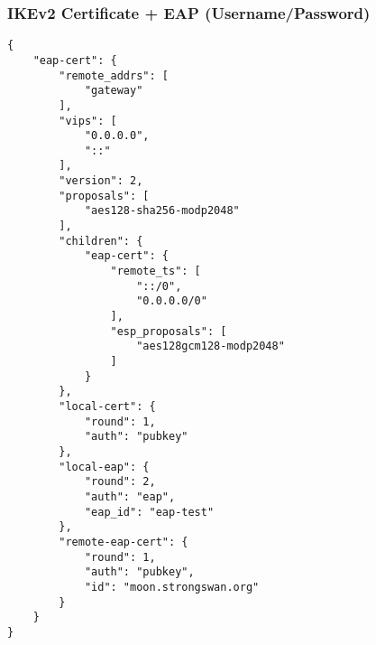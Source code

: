 \subsubsection{	IKEv2 Certificate + EAP (Username/Password)}
\begin{lstlisting}[style=BashInputStyle]
{
    "eap-cert": {
        "remote_addrs": [
            "gateway"
        ],
        "vips": [
            "0.0.0.0",
            "::"
        ],
        "version": 2,
        "proposals": [
            "aes128-sha256-modp2048"
        ],
        "children": {
            "eap-cert": {
                "remote_ts": [
                    "::/0",
                    "0.0.0.0/0"
                ],
                "esp_proposals": [
                    "aes128gcm128-modp2048"
                ]
            }
        },
        "local-cert": {
            "round": 1,
            "auth": "pubkey"
        },
        "local-eap": {
            "round": 2,
            "auth": "eap",
            "eap_id": "eap-test"
        },
        "remote-eap-cert": {
            "round": 1,
            "auth": "pubkey",
            "id": "moon.strongswan.org"
        }
    }
}
\end{lstlisting}